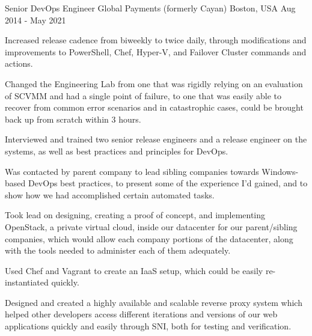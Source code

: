 \begin{cventries}
  \cventry
    {Senior DevOps Engineer} %
    {Global Payments (formerly Cayan)} %
    {Boston, USA} %
    {Aug 2014 - May 2021} %
    {
      \begin{cvitems} %
        \item {Increased release cadence from biweekly to twice daily, through modifications and improvements to PowerShell, Chef, Hyper-V, and Failover Cluster commands and actions.}
        \item {Changed the Engineering Lab from one that was rigidly relying on an evaluation of SCVMM and had a single point of failure, to one that was easily able to recover from common error scenarios and in catastrophic cases, could be brought back up from scratch within 3 hours.}
        \item {Interviewed and trained two senior release engineers and a release engineer on the systems, as well as best practices and principles for DevOps.}
        \item {Was contacted by parent company to lead sibling companies towards Windows-based DevOps best practices, to present some of the experience I'd gained, and to show how we had accomplished certain automated tasks.}
        \item {Took lead on designing, creating a proof of concept, and implementing OpenStack, a private virtual cloud, inside our datacenter for our parent/sibling companies, which would allow each company portions of the datacenter, along with the tools needed to administer each of them adequately.}
        \item {Used Chef and Vagrant to create an IaaS setup, which could be easily re-instantiated quickly.}
        \item {Designed and created a highly available and scalable reverse proxy system which helped other developers access different iterations and versions of our web applications quickly and easily through SNI, both for testing and verification.}
      \end{cvitems}
    }


\end{cventries}
